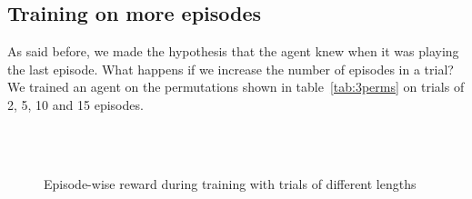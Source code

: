
\subsection{Training on more episodes}
\label{section:beyond:moreeps}
As said before, we made the hypothesis that the agent knew when it was playing
the last episode. What happens if we increase the number of episodes in a
trial? We trained an agent on the permutations shown in table~\ref{tab:3perms}
on trials of 2, 5, 10 and 15 episodes.\\
\begin{figure}
	\centering
	\\
	\\
	\caption{Episode-wise reward during training with trials of different
	lengths}
	\label{fig:varied_episode_number}
\end{figure}

